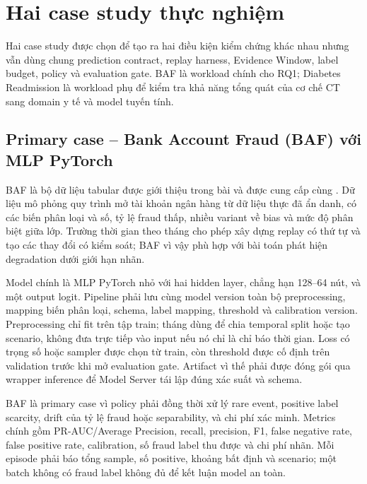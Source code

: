 \section{Hai case study thực nghiệm}

Hai case study được chọn để tạo ra hai điều kiện kiểm chứng khác nhau nhưng vẫn dùng chung prediction contract, replay harness, Evidence Window, label budget, policy và evaluation gate. BAF là workload chính cho RQ1; Diabetes Readmission là workload phụ để kiểm tra khả năng tổng quát của cơ chế CT sang domain y tế và model tuyến tính.

\subsection{Primary case -- Bank Account Fraud (BAF) với MLP PyTorch}

BAF là bộ dữ liệu tabular được giới thiệu trong bài  và được cung cấp cùng . Dữ liệu mô phỏng quy trình mở tài khoản ngân hàng từ dữ liệu thực đã ẩn danh, có các biến phân loại và số, tỷ lệ fraud thấp, nhiều variant về bias và mức độ phân biệt giữa lớp. Trường thời gian theo tháng cho phép xây dựng replay có thứ tự và tạo các thay đổi có kiểm soát; BAF vì vậy phù hợp với bài toán phát hiện degradation dưới giới hạn nhãn.

Model chính là MLP PyTorch nhỏ với hai hidden layer, chẳng hạn 128--64 nút, và một output logit. Pipeline phải lưu cùng model version toàn bộ preprocessing, mapping biến phân loại, schema, label mapping, threshold và calibration version. Preprocessing chỉ fit trên tập train; tháng dùng để chia temporal split hoặc tạo scenario, không đưa trực tiếp vào input nếu nó chỉ là chỉ báo thời gian. Loss có trọng số hoặc sampler được chọn từ train, còn threshold được cố định trên validation trước khi mở evaluation gate. Artifact  vì thế phải được đóng gói qua wrapper inference để Model Server tái lập đúng xác suất và schema.

BAF là primary case vì policy phải đồng thời xử lý rare event, positive label scarcity, drift của tỷ lệ fraud hoặc separability, và chi phí xác minh. Metrics chính gồm PR-AUC/Average Precision, recall, precision, F1, false negative rate, false positive rate, calibration, số fraud label thu được và chi phí nhãn. Mỗi episode phải báo tổng sample, số positive, khoảng bất định và scenario; một batch không có fraud label không đủ để kết luận model an toàn.

